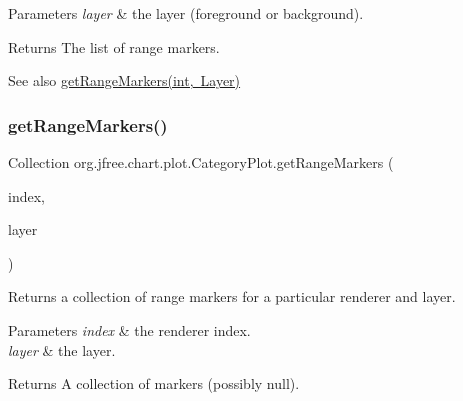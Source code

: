 \begin{DoxyParams}{Parameters}
{\em layer} & the layer (foreground or background).\\
\hline
\end{DoxyParams}
\begin{DoxyReturn}{Returns}
The list of range markers.
\end{DoxyReturn}
\begin{DoxySeeAlso}{See also}
\mbox{\hyperlink{classorg_1_1jfree_1_1chart_1_1plot_1_1_category_plot_abe445338e7bcd63480f291c5dbac24fc}{get\+Range\+Markers(int, Layer)}} 
\end{DoxySeeAlso}
\mbox{\label{classorg_1_1jfree_1_1chart_1_1plot_1_1_category_plot_abe445338e7bcd63480f291c5dbac24fc}} 
\subsubsection{\texorpdfstring{get\+Range\+Markers()}{getRangeMarkers()}\hspace{0.1cm}{\footnotesize\ttfamily [2/2]}}
{\footnotesize\ttfamily Collection org.\+jfree.\+chart.\+plot.\+Category\+Plot.\+get\+Range\+Markers (\begin{DoxyParamCaption}\item[{int}]{index,  }\item[{Layer}]{layer }\end{DoxyParamCaption})}

Returns a collection of range markers for a particular renderer and layer.


\begin{DoxyParams}{Parameters}
{\em index} & the renderer index. \\
\hline
{\em layer} & the layer.\\
\hline
\end{DoxyParams}
\begin{DoxyReturn}{Returns}
A collection of markers (possibly {\ttfamily null}). 
\end{DoxyReturn}
\mbox{\label{classorg_1_1jfree_1_1chart_1_1plot_1_1_category_plot_a8674b0eb62f825645f314351468d24c1}} 
